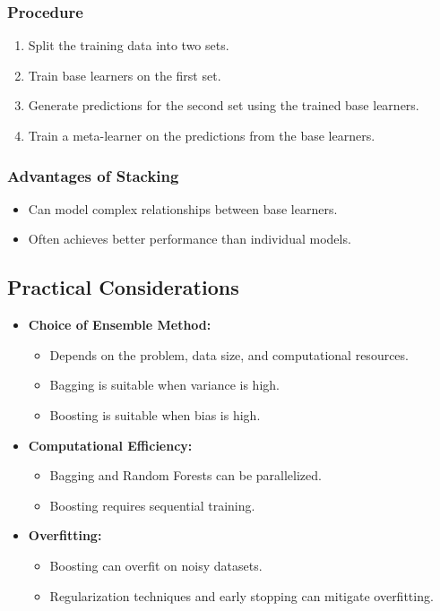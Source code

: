 \documentclass{article}
\begin{document}
\subsubsection{Procedure}

\begin{enumerate}
    \item Split the training data into two sets.
    \item Train base learners on the first set.
    \item Generate predictions for the second set using the trained base learners.
    \item Train a meta-learner on the predictions from the base learners.
\end{enumerate}

\subsubsection{Advantages of Stacking}

\begin{itemize}
    \item Can model complex relationships between base learners.
    \item Often achieves better performance than individual models.
\end{itemize}

\subsection{Practical Considerations}

\begin{itemize}
    \item \textbf{Choice of Ensemble Method:}
    \begin{itemize}
        \item Depends on the problem, data size, and computational resources.
        \item Bagging is suitable when variance is high.
        \item Boosting is suitable when bias is high.
    \end{itemize}
    \item \textbf{Computational Efficiency:}
    \begin{itemize}
        \item Bagging and Random Forests can be parallelized.
        \item Boosting requires sequential training.
    \end{itemize}
    \item \textbf{Overfitting:}
    \begin{itemize}
        \item Boosting can overfit on noisy datasets.
        \item Regularization techniques and early stopping can mitigate overfitting.
    \end{itemize}
\end{itemize}
\end{document}
